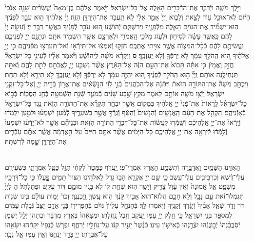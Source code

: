 \documentclass[twoside, openany, parskip=half, 11pt]{book}
\begin{document}
\begin{footnotesize}
\begin{multicols}{2}
\\
וַיֵּ֖לֶךְ מֹשֶׁ֑ה וַיְֿדַבֵּ֛ר אֶת־הַדְּֿבָרִ֥ים הָאֵ֖לֶּה אֶל־כׇּל־יִשְׂרָאֵֽל׃ וַיֹּ֣אמֶר אֲלֵהֶ֗ם בֶּן־מֵאָה֩ וְֿעֶשְׂרִ֨ים שָׁנָ֤ה אָֽנֹכִי֙ הַיּ֔וֹם לֹֽא־אוּכַ֥ל ע֖וֹד לָצֵ֣את וְֿלָב֑וֹא וַֽיְיָ֙ אָמַ֣ר אֵלַ֔י לֹ֥א תַֽעֲבֹ֖ר אֶת־הַיַּרְדֵּ֥ן הַזֶּֽה׃ יְיָ֨ אֱלֹהֶ֜יךָ ה֣וּא עֹבֵ֣ר לְֿפָנֶ֗יךָ הֽוּא־יַשְׁמִ֞יד אֶת־הַגּוֹיִ֥ם הָאֵ֛לֶּה מִלְּֿפָנֶ֖יךָ וִֽירִשְׁתָּ֑ם יְֿהוֹשֻׁ֗עַ ה֚וּא עֹבֵ֣ר לְֿפָנֶ֔יךָ כַּֽאֲשֶׁ֖ר דִּבֶּ֥ר יְיָ׃
וְֿעָשָׂ֤ה יְיָ֙ לָהֶ֔ם כַּֽאֲשֶׁ֣ר עָשָׂ֗ה לְֿסִיח֥וֹן וּלְע֛וֹג מַלְכֵ֥י הָֽאֱמֹרִ֖י וּלְאַרְצָ֑ם אֲשֶׁ֥ר הִשְׁמִ֖יד אֹתָֽם׃ וּנְתָנָ֥ם יְיָ֖ לִפְנֵיכֶ֑ם וַֽעֲשִׂיתֶ֣ם לָהֶ֔ם כְּֿכָ֨ל־הַמִּצְוָ֔ה אֲשֶׁ֥ר צִוִּ֖יתִי אֶתְכֶֽם׃ חִזְק֣וּ וְֿאִמְצ֔וּ אַל־תִּֽירְֿא֥וּ וְֿאַל־תַּֽעַרְצ֖וּ מִפְּֿנֵיהֶ֑ם כִּ֣י יְיָ֣ אֱלֹהֶ֗יךָ ה֚וּא הַֽהֹלֵ֣ךְ עִמָּ֔ךְ לֹ֥א יַרְפְּֿךָ֖ וְֿלֹ֥א יַֽעַזְבֶֽךָּ׃ \textbf{ס}
וַיִּקְרָ֨א מֹשֶׁ֜ה לִֽיהוֹשֻׁ֗עַ וַיֹּ֨אמֶר אֵלָ֜יו לְֿעֵינֵ֣י כׇל־יִשְׂרָאֵל֘ חֲזַ֣ק וֶֽאֱמָץ֒ כִּ֣י אַתָּ֗ה תָּבוֹא֙ אֶת־הָעָ֣ם הַזֶּ֔ה אֶל־הָאָ֕רֶץ אֲשֶׁ֨ר נִשְׁבַּ֧ע יְיָ֛ לַֽאֲבֹתָ֖ם לָתֵ֣ת לָהֶ֑ם וְֿאַתָּ֖ה תַּנְחִילֶ֥נָּה אוֹתָֽם׃ וַֽיְיָ֞ ה֣וּא הַֽהֹלֵ֣ךְ לְֿפָנֶ֗יךָ ה֚וּא יִהְיֶ֣ה עִמָּ֔ךְ לֹ֥א יַרְפְּֿךָ֖ וְֿלֹ֣א יַֽעַזְבֶ֑ךָּ לֹ֥א תִירָ֖א וְֿלֹ֥א תֵחָֽת׃ וַיִּכְתֹּ֣ב מֹשֶׁה֘ אֶת־הַתּוֹרָ֣ה הַזֹּאת֒ וַֽיִּתְּֿנָ֗הּ אֶל־הַכֹּֽהֲנִים֙ בְּֿנֵ֣י לֵוִ֔י הַנֹּ֣שְֿׂאִ֔ים אֶת־אֲר֖וֹן בְּֿרִ֣ית יְיָ֑ וְֿאֶל־כׇּל־זִקְנֵ֖י יִשְׂרָאֵֽל׃ וַיְֿצַ֥ו מֹשֶׁ֖ה אוֹתָ֣ם לֵאמֹ֑ר מִקֵּ֣ץ שֶׁ֣בַע שָׁנִ֗ים בְּֿמֹעֵ֛ד שְֿׁנַ֥ת הַשְּֿׁמִטָּ֖ה בְּֿחַ֥ג הַסֻּכּֽוֹת׃ בְּֿב֣וֹא כׇל־יִשְׂרָאֵ֗ל לֵֽרָאוֹת֙ אֶת־פְּֿנֵי֙ יְיָ֣ אֱלֹהֶ֔יךָ בַּמָּק֖וֹם אֲשֶׁ֣ר יִבְחָ֑ר תִּקְרָ֞א אֶת־הַתּוֹרָ֥ה הַזֹּ֛את נֶ֥גֶד כׇּל־יִשְׂרָאֵ֖ל בְּֿאָזְֿנֵיהֶֽם׃ הַקְהֵ֣ל אֶת־הָעָ֗ם הָֽאֲנָשִׁ֤ים וְֿהַנָּשִׁים֙ וְֿהַטַּ֔ף וְֿגֵֽרְֿךָ֖ אֲשֶׁ֣ר בִּשְׁעָרֶ֑יךָ לְֿמַ֨עַן יִשְׁמְע֜וּ וּלְמַ֣עַן יִלְמְד֗וּ וְֿיָֽרְֿאוּ֙ אֶת־יְיָ֣ אֱלֹֽהֵיכֶ֔ם וְֿשָֽׁמְֿר֣וּ לַֽעֲשׂ֔וֹת אֶת־כׇּל־דִּבְרֵ֖י הַתּוֹרָ֥ה הַזֹּֽאת׃ וּבְנֵיהֶ֞ם אֲשֶׁ֣ר לֹא־יָֽדְֿע֗וּ יִשְׁמְעוּ֙ וְֿלָ֣מְֿד֔וּ לְֿיִרְאָ֖ה אֶת־יְיָ֣ אֱלֹֽהֵיכֶ֑ם כׇּל־הַיָּמִ֗ים אֲשֶׁ֨ר אַתֶּ֤ם חַיִּים֙ עַל־הָ֣אֲדָמָ֔ה אֲשֶׁ֨ר אַתֶּ֜ם עֹֽבְֿרִ֧ים אֶת־הַיַּרְדֵּ֛ן שׇׇׇָׁ֖מָּה לְֿרִשְׁתָּֽהּ׃

\\
הַֽאֲזִ֥ינוּ הַשָּׁמַ֖יִם וַֽאֲדַבֵּ֑רָה וְֿתִשְׁמַ֥ע הָאָ֖רֶץ אִמְרֵי־פִֽי׃
יַֽעֲרֹ֤ף כַּמָּטָר֙ לִקְחִ֔י תִּזַּ֥ל כַּטַּ֖ל אִמְרָתִ֑י
כִּשְׂעִירִ֣ם עֲלֵי־דֶ֔שֶׁא וְֿכִרְבִיבִ֖ים עֲלֵי־עֵֽשֶׂב׃
כִּ֛י שֵׁ֥ם יְיָ֖ אֶקְרָ֑א הָב֥וּ גֹ֖דֶל לֵֽאלֹהֵֽינוּ׃
הַצּוּר֙ תָּמִ֣ים פׇׇׇׇׇָּֽעֳל֔וֹ כִּ֥י כׇל־דְּֿרָכָ֖יו מִשְׁפָּ֑ט
אֵ֤ל אֱמוּנָה֙ וְֿאֵ֣ין עָ֔וֶל צַדִּ֥יק וְֿיָשָׁ֖ר הֽוּא׃
שִׁחֵ֥ת ל֛וֹ לֹ֖א בָּנָ֣יו מוּמָ֑ם דּ֥וֹר עִקֵּ֖שׁ וּפְתַלְתֹּֽל׃
הַ לְיְיָ֙ תִּגְמְלוּ־זֹ֔את עַ֥ם נָבָ֖ל וְֿלֹ֣א חָכָ֑ם
הֲלוֹא־הוּא֙ אָבִ֣יךָ קָּנֶ֔ךָ ה֥וּא עָֽשְֿׂךָ֖ וַֽיְֿכֹֽנֲנֶֽךָ׃
זְֿכֹר֙ יְֿמ֣וֹת עוֹלָ֔ם בִּ֖ינוּ שְֿׁנ֣וֹת דֹּר וָדֹ֑ר
שְֿׁאַ֤ל אָבִ֨יךָ֙ וְֿיַגֵּ֔דְךָ זְֿקֵנֶ֖יךָ וְֿיֹ֥אמְרוּ לָֽךְ׃
בְּֿהַנְחֵ֤ל עֶלְיוֹן֙ גּוֹיִ֔ם בְּֿהַפְרִיד֖וֹ בְּֿנֵ֣י אָדָ֑ם
יַצֵּב֙ גְּֿבֻלֹ֣ת עַמִּ֔ים לְֿמִסְפַּ֖ר בְּֿנֵ֥י יִשְׂרָאֵֽל׃
כִּ֛י חֵ֥לֶק יְיָ֖ עַמּ֑וֹ יַֽעֲקֹ֖ב חֶ֥בֶל נַֽחֲלָתֽוֹ׃
יִמְצָאֵ֨הוּ֙ בְּֿאֶ֣רֶץ מִדְבָּ֔ר וּבְתֹ֖הוּ יְֿלֵ֣ל יְֿשִׁמֹ֑ן
יְֿסֹֽבֲבֶ֨נְהוּ֙ יְֿב֣וֹנֲנֵ֔הוּ יִצְּֿרֶ֖נְהוּ כְּֿאִישׁ֥וֹן עֵינֽוֹ׃
כְּֿנֶ֨שֶׁר֙ יָעִ֣יר קִנּ֔וֹ עַל־גּֽוֹזָלָ֖יו יְֿרַחֶ֑ף
יִפְרֹ֤שׂ כְּֿנָפָיו֙ יִקָּחֵ֔הוּ יִשָּׂאֵ֖הוּ עַל־אֶבְרָתֽוֹ׃
יְיָ֖ בָּדָ֣ד יַנְחֶ֑נּוּ וְֿאֵ֥ין עִמּ֖וֹ אֵ֥ל נֵכָֽר׃


\end{multicols}
\end{footnotesize}
\end{document}
